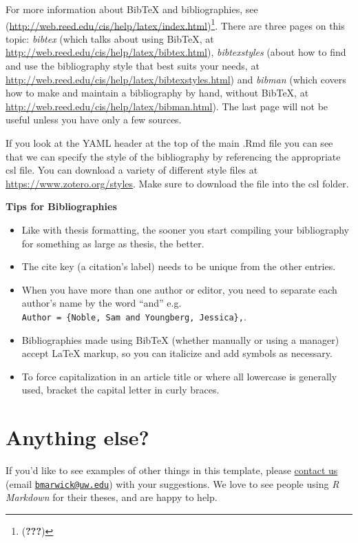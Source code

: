 \documentclass [11pt, proquest] {uwthesis}[2015/03/03]
\providecommand{\tightlist}{%
  \setlength{\itemsep}{0pt}\setlength{\parskip}{0pt}}
\begin{document}
For more information about BibTeX and bibliographies, see
(\url{http://web.reed.edu/cis/help/latex/index.html})\footnote{({\textbf{???}})}.
There are three pages on this topic: \emph{bibtex} (which talks about
using BibTeX, at \url{http://web.reed.edu/cis/help/latex/bibtex.html}),
\emph{bibtexstyles} (about how to find and use the bibliography style
that best suits your needs, at
\url{http://web.reed.edu/cis/help/latex/bibtexstyles.html}) and
\emph{bibman} (which covers how to make and maintain a bibliography by
hand, without BibTeX, at
\url{http://web.reed.edu/cis/help/latex/bibman.html}). The last page
will not be useful unless you have only a few sources.

If you look at the YAML header at the top of the main .Rmd file you can
see that we can specify the style of the bibliography by referencing the
appropriate csl file. You can download a variety of different style
files at \url{https://www.zotero.org/styles}. Make sure to download the
file into the csl folder.

\textbf{Tips for Bibliographies}
\begin{itemize}
\tightlist
\item
  Like with thesis formatting, the sooner you start compiling your
  bibliography for something as large as thesis, the better.
\item
  The cite key (a citation's label) needs to be unique from the other
  entries.
\item
  When you have more than one author or editor, you need to separate
  each author's name by the word ``and'' e.g.
  \texttt{Author\ =\ \{Noble,\ Sam\ and\ Youngberg,\ Jessica\},}.
\item
  Bibliographies made using BibTeX (whether manually or using a manager)
  accept LaTeX markup, so you can italicize and add symbols as
  necessary.
\item
  To force capitalization in an article title or where all lowercase is
  generally used, bracket the capital letter in curly braces.
\end{itemize}
\section{Anything else?}\label{anything-else}

If you'd like to see examples of other things in this template, please
\href{https://github.com/benmarwick/huskydown/issues/new}{contact us}
(email \href{mailto:bmarwick@uw.edu}{\nolinkurl{bmarwick@uw.edu}}) with
your suggestions. We love to see people using \emph{R Markdown} for
their theses, and are happy to help.
\end{document}
